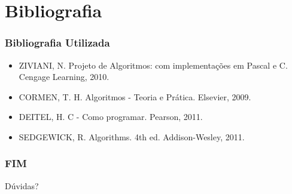 \documentclass[aspectratio=169]{beamer}
\begin{document}
%

\section{Bibliografia}

\begin{frame}
\frametitle{Bibliografia Utilizada}
\begin{itemize}
 \item ZIVIANI, N. Projeto de Algoritmos: com implementações em Pascal e C.
Cengage Learning, 2010.
 \item CORMEN, T. H. Algoritmos - Teoria e Prática. Elsevier, 2009.
 \item DEITEL, H. C - Como programar. Pearson, 2011.
 \item SEDGEWICK, R. Algorithms. 4th ed. Addison-Wesley, 2011.
\end{itemize}
\end{frame}


\begin{frame}
  \frametitle{FIM}
\centering
\huge{Dúvidas?}
\end{frame}	
\end{document}
